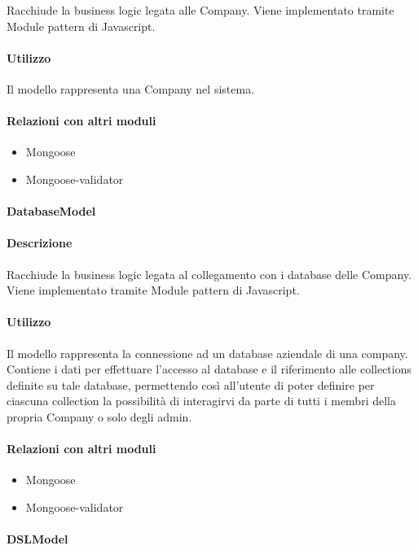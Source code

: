 Racchiude la business logic legata alle Company. Viene implementato tramite Module pattern di Javascript. 

\paragraph*{Utilizzo}
Il modello rappresenta una Company nel sistema.

\paragraph*{Relazioni con altri moduli}
\begin{itemize}
\item Mongoose
\item Mongoose-validator
\end{itemize}

\paragraph{DatabaseModel}
\paragraph*{Descrizione}

Racchiude la business logic legata al collegamento con i database delle Company. Viene implementato tramite Module pattern di Javascript. 

\paragraph*{Utilizzo}
Il modello rappresenta la connessione ad un database aziendale di una company. Contiene i dati per effettuare l'accesso al database e il riferimento alle collections definite su tale database, permettendo così all'utente di poter definire per ciascuna collection la possibilità di interagirvi da parte di tutti i membri della propria Company o solo degli admin.

\paragraph*{Relazioni con altri moduli}
\begin{itemize}
\item Mongoose
\item Mongoose-validator
\end{itemize}

\paragraph{DSLModel}
